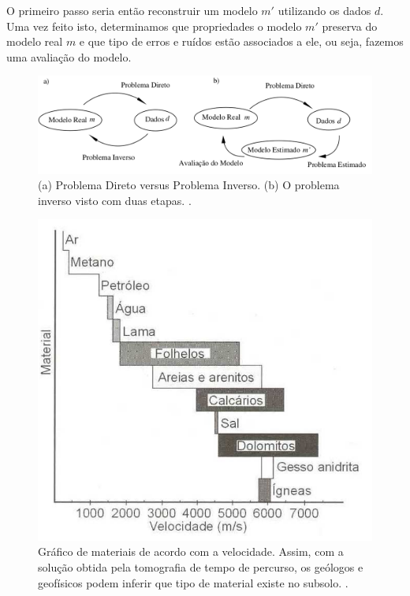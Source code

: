 \documentclass[a4paper, 12 pt]{article} %
\begin{document}
O primeiro passo seria então reconstruir um modelo $m'$ utilizando os dados $d$. Uma vez feito isto, determinamos que propriedades o modelo $m'$ preserva do modelo real $m$ e que tipo de erros e ruídos estão associados a ele, ou seja,
fazemos uma avaliação do modelo.

\begin{figure}[!hbtp]
	\begin{center}
		
		\includegraphics[scale=0.43]{Figuras/problema_direto_x_inverso.png}
	\end{center}
	\caption{(a) Problema Direto versus Problema Inverso. (b) O problema inverso visto com duas etapas. \cite{tempopercurso}.}
	\label{direto_inverso}
\end{figure}

\begin{figure}[!hbtp]
	\begin{center}
		\includegraphics[scale=0.32]{Figuras/material.png}
	\end{center}
	\caption{Gráfico de materiais de acordo com a velocidade. Assim, com a solução obtida pela tomografia de tempo de percurso, os geólogos e geofísicos podem inferir que tipo de material existe no subsolo. \cite{tempopercurso}.}
	\label{material}
\end{figure}
\end{document}
